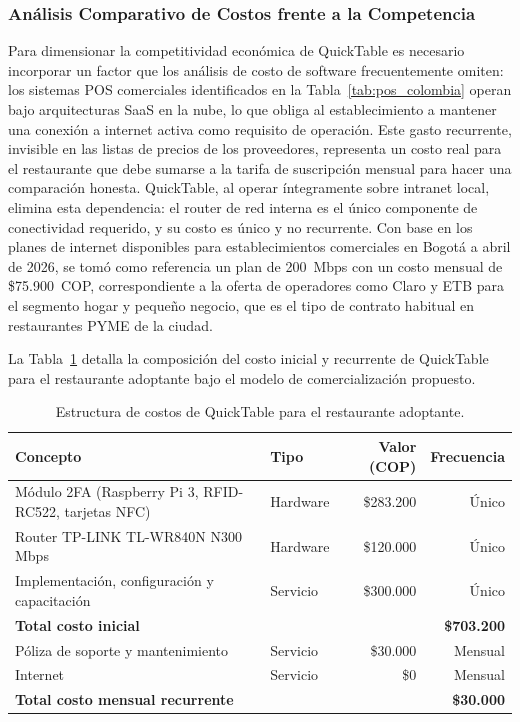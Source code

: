 \subsubsection*{Análisis Comparativo de Costos frente a la Competencia}

Para dimensionar la competitividad económica de QuickTable es necesario incorporar un factor
que los análisis de costo de software frecuentemente omiten: los sistemas POS comerciales
identificados en la Tabla~\ref{tab:pos_colombia} operan bajo arquitecturas SaaS en la
nube, lo que obliga al establecimiento a mantener una conexión a internet activa como
requisito de operación. Este gasto recurrente, invisible en las listas de precios de los
proveedores, representa un costo real para el restaurante que debe sumarse a la tarifa de
suscripción mensual para hacer una comparación honesta. QuickTable, al operar
íntegramente sobre intranet local, elimina esta dependencia: el router de red interna
es el único componente de conectividad requerido, y su costo es único y no recurrente.
Con base en los planes de internet disponibles para establecimientos comerciales en Bogotá
a abril de 2026, se tomó como referencia un plan de 200~Mbps con un costo mensual de
\$75.900~COP, correspondiente a la oferta de operadores como Claro y ETB para el
segmento hogar y pequeño negocio, que es el tipo de contrato habitual en restaurantes
PYME de la ciudad.

La Tabla~\ref{tab:estructura_costos_qt} detalla la composición del costo inicial y
recurrente de QuickTable para el restaurante adoptante bajo el modelo de comercialización
propuesto.

\begin{table}[H]
	\centering
	\caption{Estructura de costos de QuickTable para el restaurante adoptante.}
	\label{tab:estructura_costos_qt}
	\begin{tabular}{l l r r}
		\hline
		\textbf{Concepto} & \textbf{Tipo} & \textbf{Valor (COP)} & \textbf{Frecuencia} \\
		\hline
		Módulo 2FA (Raspberry Pi 3, RFID-RC522, tarjetas NFC) & Hardware & \$283.200 & Único \\
		Router TP-LINK TL-WR840N N300 Mbps                    & Hardware & \$120.000 & Único \\
		Implementación, configuración y capacitación           & Servicio & \$300.000 & Único \\
		\hline
		\multicolumn{2}{l}{\textbf{Total costo inicial}}       &          & \textbf{\$703.200} \\
		\hline
		Póliza de soporte y mantenimiento                      & Servicio & \$30.000  & Mensual \\
		Internet                                               & Servicio & \$0       & Mensual \\
		\hline
		\multicolumn{2}{l}{\textbf{Total costo mensual recurrente}} &     & \textbf{\$30.000} \\
		\hline
	\end{tabular}
\end{table}



